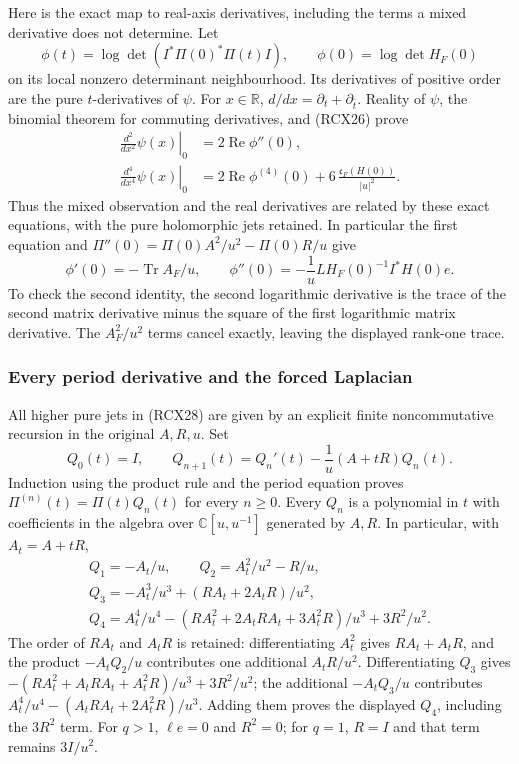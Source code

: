 Here is the exact map to real-axis derivatives, including the
terms a mixed derivative does not determine. Let
\[
 \phi(t)=\log\det\!\left(I^*\Pi(0)^*\Pi(t)I\right),
 \qquad \phi(0)=\log\det H_F(0)
 \tag{RCX27}
\]
on its local nonzero determinant neighbourhood. Its derivatives
of positive order are the pure \(t\)-derivatives of \(\psi\).
For \(x\in\mathbb R\), \(d/dx=\partial_t+\partial_{\bar t}\).
Reality of \(\psi\), the binomial theorem for commuting derivatives,
and (RCX26) prove
\[
\begin{split}
 \left.\frac{d^2}{dx^2}\psi(x)\right|_0
   &=2\operatorname{Re}\phi''(0),\\
 \left.\frac{d^4}{dx^4}\psi(x)\right|_0
   &=2\operatorname{Re}\phi^{(4)}(0)
       +6\,\frac{\mathfrak c_F(H(0))}{|u|^2}.
\end{split}\tag{RCX28}
\]
Thus the mixed observation and the real derivatives are related
by these exact equations, with the pure holomorphic jets retained.
In particular the first equation and
\(\Pi''(0)=\Pi(0)A^2/u^2-\Pi(0)R/u\) give
\[
 \phi'(0)=-\operatorname{Tr}A_F/u,\qquad
 \phi''(0)=-\frac1u L H_F(0)^{-1}I^*H(0)e .
 \tag{RCX29}
\]
To check the second identity, the second logarithmic derivative
is the trace of the second matrix derivative minus the square
of the first logarithmic matrix derivative. The \(A_F^2/u^2\)
terms cancel exactly, leaving the displayed rank-one trace.

\subsubsection{Every period derivative and the forced Laplacian}

All higher pure jets in (RCX28) are given by an explicit finite
noncommutative recursion in the original \(A,R,u\). Set
\[
 Q_0(t)=I,\qquad
 Q_{n+1}(t)=Q_n'(t)-\frac1u(A+tR)Q_n(t).
 \tag{RCX30}
\]
Induction using the product rule and the period equation proves
\(\Pi^{(n)}(t)=\Pi(t)Q_n(t)\) for every \(n\ge0\).
Every \(Q_n\) is a polynomial in \(t\) with coefficients in the
algebra over \(\mathbb C[u,u^{-1}]\) generated by \(A,R\).
In particular, with \(A_t=A+tR\),
\[
 \begin{gathered}
 Q_1=-A_t/u,\qquad Q_2=A_t^2/u^2-R/u,\\
 Q_3=-A_t^3/u^3+(RA_t+2A_tR)/u^2,\\
 Q_4=A_t^4/u^4
       -(RA_t^2+2A_tRA_t+3A_t^2R)/u^3+3R^2/u^2 .
 \end{gathered}
 \tag{RCX31}
\]
The order of \(RA_t\) and \(A_tR\) is retained: differentiating
\(A_t^2\) gives \(RA_t+A_tR\), and the product
\(-A_tQ_2/u\) contributes one additional \(A_tR/u^2\).
Differentiating \(Q_3\) gives
\(-(RA_t^2+A_tRA_t+A_t^2R)/u^3+3R^2/u^2\);
the additional \(-A_tQ_3/u\) contributes
\(A_t^4/u^4-(A_tRA_t+2A_t^2R)/u^3\).
Adding them proves the displayed \(Q_4\), including the \(3R^2\)
term. For \(q>1\), \(\ell e=0\) and \(R^2=0\); for \(q=1\),
\(R=I\) and that term remains \(3I/u^2\).

